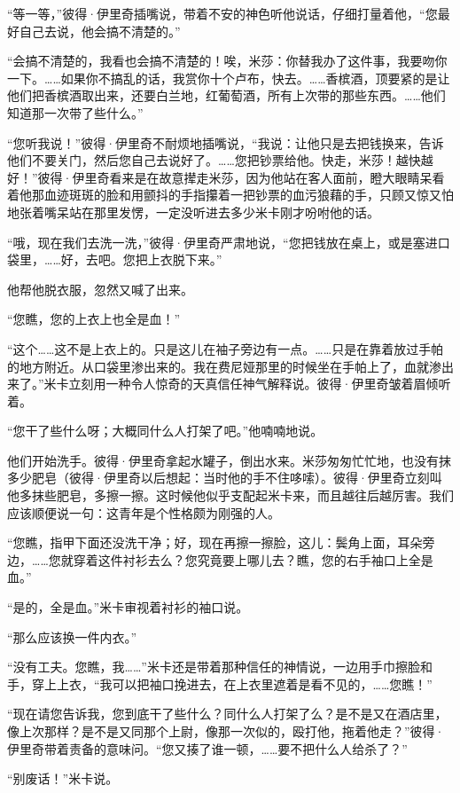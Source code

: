 \par “等一等，”彼得·伊里奇插嘴说，带着不安的神色听他说话，仔细打量着他，“您最好自己去说，他会搞不清楚的。”
\par “会搞不清楚的，我看也会搞不清楚的！唉，米莎：你替我办了这件事，我要吻你一下。……如果你不搞乱的话，我赏你十个卢布，快去。……香槟酒，顶要紧的是让他们把香槟酒取出来，还要白兰地，红葡萄酒，所有上次带的那些东西。……他们知道那一次带了些什么。”
\par “您听我说！”彼得·伊里奇不耐烦地插嘴说，“我说：让他只是去把钱换来，告诉他们不要关门，然后您自己去说好了。……您把钞票给他。快走，米莎！越快越好！”彼得·伊里奇看来是在故意撵走米莎，因为他站在客人面前，瞪大眼睛呆看着他那血迹斑斑的脸和用颤抖的手指攥着一把钞票的血污狼藉的手，只顾又惊又怕地张着嘴呆站在那里发愣，一定没听进去多少米卡刚才吩咐他的话。
\par “哦，现在我们去洗一洗，”彼得·伊里奇严肃地说，“您把钱放在桌上，或是塞进口袋里，……好，去吧。您把上衣脱下来。”
\par 他帮他脱衣服，忽然又喊了出来。
\par “您瞧，您的上衣上也全是血！”
\par “这个……这不是上衣上的。只是这儿在袖子旁边有一点。……只是在靠着放过手帕的地方附近。从口袋里渗出来的。我在费尼娅那里的时候坐在手帕上了，血就渗出来了。”米卡立刻用一种令人惊奇的天真信任神气解释说。彼得·伊里奇皱着眉倾听着。
\par “您干了些什么呀；大概同什么人打架了吧。”他喃喃地说。
\par 他们开始洗手。彼得·伊里奇拿起水罐子，倒出水来。米莎匆匆忙忙地，也没有抹多少肥皂（彼得·伊里奇以后想起：当时他的手不住哆嗦）。彼得·伊里奇立刻叫他多抹些肥皂，多擦一擦。这时候他似乎支配起米卡来，而且越往后越厉害。我们应该顺便说一句：这青年是个性格颇为刚强的人。
\par “您瞧，指甲下面还没洗干净；好，现在再擦一擦脸，这儿：鬓角上面，耳朵旁边，……您就穿着这件衬衫去么？您究竟要上哪儿去？瞧，您的右手袖口上全是血。”
\par “是的，全是血。”米卡审视着衬衫的袖口说。
\par “那么应该换一件内衣。”
\par “没有工夫。您瞧，我……”米卡还是带着那种信任的神情说，一边用手巾擦脸和手，穿上上衣，“我可以把袖口挽进去，在上衣里遮着是看不见的，……您瞧！”
\par “现在请您告诉我，您到底干了些什么？同什么人打架了么？是不是又在酒店里，像上次那样？是不是又同那个上尉，像那一次似的，殴打他，拖着他走？”彼得·伊里奇带着责备的意味问。“您又揍了谁一顿，……要不把什么人给杀了？”
\par “别废话！”米卡说。
